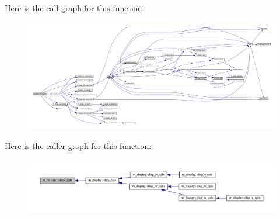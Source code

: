 Here is the call graph for this function\+:
\nopagebreak
\begin{figure}[H]
\begin{center}
\leavevmode
\includegraphics[width=350pt]{namespacem__display_a95571f3e4015bb187bcc1785c76013f9_cgraph}
\end{center}
\end{figure}
Here is the caller graph for this function\+:
\nopagebreak
\begin{figure}[H]
\begin{center}
\leavevmode
\includegraphics[width=350pt]{namespacem__display_a95571f3e4015bb187bcc1785c76013f9_icgraph}
\end{center}
\end{figure}
\mbox{\label{namespacem__display_abcff2aedbfe00eb52827b4941af59831}} 
